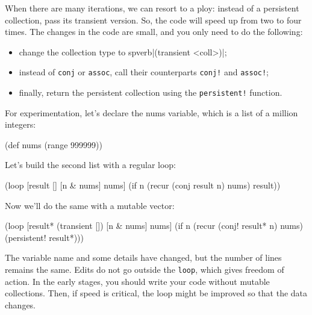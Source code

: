 When there are many iterations, we can resort to a ploy: instead of a persistent collection, pass its transient version. So, the code will speed up from two to four times. The changes in the code are small, and you only need to do the following:

\begin{itemize}

\item
  change the collection type to spverb|(transient <coll>)|;

\item
  instead of \verb|conj| or \verb|assoc|, call their counterparts \verb|conj!| and \verb|assoc!|;

\item
  finally, return the persistent collection using the \verb|persistent!| function.

\end{itemize}

For experimentation, let's declare the nums variable, which is a list of a million integers:

\begin{english}
  \begin{clojure}
(def nums (range 999999))
  \end{clojure}
\end{english}


\noindent
Let's build the second list with a regular loop:

\begin{english}
  \begin{clojure}
(loop [result []
       [n & nums] nums]
  (if n
    (recur (conj result n) nums)
    result))
  \end{clojure}
\end{english}

\noindent
Now we'll do the same with a mutable vector:

\begin{english}
  \begin{clojure}
(loop [result* (transient [])
       [n & nums] nums]
  (if n
    (recur (conj! result* n) nums)
    (persistent! result*)))
  \end{clojure}
\end{english}

The variable name and some details have changed, but the number of lines remains the same.
Edits do not go outside the \verb|loop|, which gives freedom of action.
In the early stages, you should write your code without mutable collections.
Then, if speed is critical, the loop might be improved so that the data changes.


